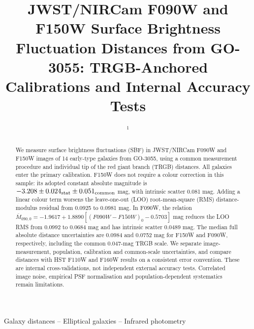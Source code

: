 \documentclass[nodoi,nocopyright]{pas}
\newcommand{\Mbar}{\overline{M}}
\begin{document}
\renewcommand{\doitext}{}
\title{JWST/NIRCam F090W and F150W Surface Brightness Fluctuation Distances
from GO-3055: TRGB-Anchored Calibrations and Internal Accuracy Tests}
\author{ $^1$}

\begin{abstract}
We measure surface brightness fluctuations (SBF) in JWST/NIRCam F090W and
F150W images of 14 early-type galaxies from GO-3055, using a common
measurement procedure and individual tip of the red giant branch (TRGB)
distances. All galaxies enter the primary calibration. F150W does not
require a colour correction in this sample: its adopted constant absolute
magnitude is $-3.208\pm0.024_{\rm stat}\pm0.051_{\rm common}$ mag, with
intrinsic scatter 0.081 mag. Adding a linear colour term worsens the
leave-one-out (LOO) root-mean-square (RMS) distance-modulus residual
from 0.0925 to 0.0981 mag.
In F090W, the relation
$\Mbar_{090,0}=-1.9617+1.8890[(F090W-F150W)_0-0.5703]$ mag reduces
the LOO RMS from 0.0992 to 0.0684 mag and has intrinsic scatter 0.0489 mag.
The median full absolute distance uncertainties are 0.0984 and 0.0752 mag
for F150W and F090W, respectively, including the common 0.047-mag TRGB scale.
We separate image-measurement, population, calibration and common-scale
uncertainties, and compare distances with HST F110W and F160W results on
a consistent error convention. These are internal cross-validations, not
independent external accuracy tests. Correlated image noise, empirical
PSF normalisation and population-dependent systematics remain limitations.
\end{abstract}
\begin{keywords}
Galaxy distances -- Elliptical galaxies -- Infrared photometry
\end{keywords}
\maketitle\endgroup
\end{document}
